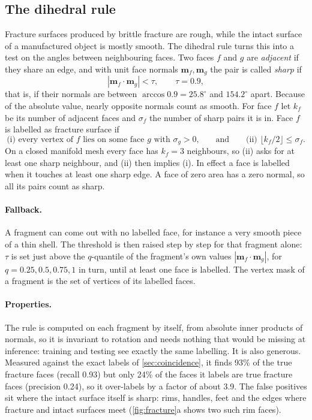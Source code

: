 \documentclass[11pt,a4paper]{article}
\theoremstyle{remark}
\begin{document}
\subsection{The dihedral rule}
\label{sec:dihedral}
Fracture surfaces produced by brittle fracture are rough, while the intact surface of a manufactured object is mostly smooth. The dihedral rule turns this into a test on the angles between neighbouring faces. Two faces $f$ and $g$ are \emph{adjacent} if they share an edge, and with unit face normals $\mathbf m_f,\mathbf m_g$ the pair is called \emph{sharp} if
\begin{equation}
  |\mathbf m_f\cdot\mathbf m_g|<\tau,\qquad\tau=0.9,
  \label{eq:sharp}
\end{equation}
that is, if their normals are between $\arccos 0.9=25.8^\circ$ and $154.2^\circ$ apart. Because of the absolute value, nearly opposite normals count as smooth. For face $f$ let $k_f$ be its number of adjacent faces and $\sigma_f$ the number of sharp pairs it is in. Face $f$ is labelled as fracture surface if
\begin{equation}
  \text{(i) every vertex of $f$ lies on some face $g$ with $\sigma_g>0$,}\qquad\text{and}\qquad
  \text{(ii) }\big\lfloor k_f/2\big\rfloor\le\sigma_f .
\end{equation}
On a closed manifold mesh every face has $k_f=3$ neighbours, so (ii) asks for at least one sharp neighbour, and (ii) then implies (i). In effect a face is labelled when it touches at least one sharp edge. A face of zero area has a zero normal, so all its pairs count as sharp.

\paragraph{Fallback.} A fragment can come out with no labelled face, for instance a very smooth piece of a thin shell. The threshold is then raised step by step for that fragment alone: $\tau$ is set just above the $q$-quantile of the fragment's own values $|\mathbf m_f\cdot\mathbf m_g|$, for $q=0.25,0.5,0.75,1$ in turn, until at least one face is labelled. The vertex mask of a fragment is the set of vertices of its labelled faces.

\paragraph{Properties.} The rule is computed on each fragment by itself, from absolute inner products of normals, so it is invariant to rotation and needs nothing that would be missing at inference: training and testing see exactly the same labelling. It is also generous. Measured against the exact labels of \cref{sec:coincidence}, it finds 93\% of the true fracture faces (recall 0.93) but only 24\% of the faces it labels are true fracture faces (precision 0.24), so it over-labels by a factor of about 3.9. The false positives sit where the intact surface itself is sharp: rims, handles, feet and the edges where fracture and intact surfaces meet (\cref{fig:fracture}a shows two such rim faces).
\end{document}
